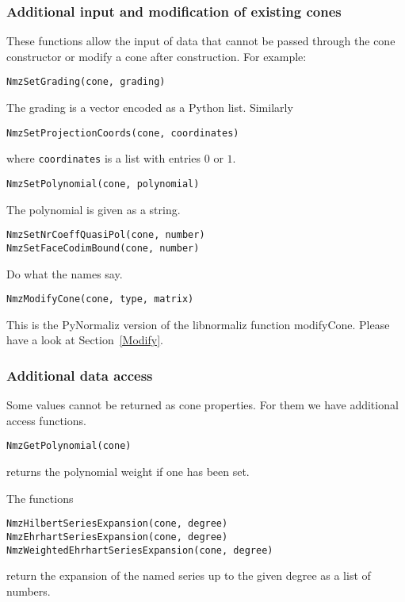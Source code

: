 \documentclass[12pt,a4paper]{scrartcl}
\theoremstyle{definition}
\begin{document}
\begin{small}
\subsubsection{Additional input and modification of existing cones}

These functions allow the input of data that cannot be passed through the cone constructor or modify a cone after construction. For example:
\begin{Verbatim}
NmzSetGrading(cone, grading)
\end{Verbatim}
The grading is a vector encoded as a Python list. Similarly
\begin{Verbatim}
NmzSetProjectionCoords(cone, coordinates)
\end{Verbatim}
where \verb|coordinates| is a list with entries $0$ or $1$.

\begin{Verbatim}
NmzSetPolynomial(cone, polynomial)
\end{Verbatim}
The polynomial is given as a string.

\begin{Verbatim}
NmzSetNrCoeffQuasiPol(cone, number)
NmzSetFaceCodimBound(cone, number)
\end{Verbatim}
Do what the names say.

\begin{Verbatim}
NmzModifyCone(cone, type, matrix)
\end{Verbatim}
This is the PyNormaliz version of the libnormaliz function modifyCone. Please have a look at Section~\ref{Modify}.

\subsubsection{Additional data access}

Some values cannot be returned as cone properties. For them we have additional access functions.

\begin{Verbatim}
NmzGetPolynomial(cone)
\end{Verbatim}
returns the polynomial weight if one has been set.

The functions
\begin{Verbatim}
NmzHilbertSeriesExpansion(cone, degree)
NmzEhrhartSeriesExpansion(cone, degree)
NmzWeightedEhrhartSeriesExpansion(cone, degree)
\end{Verbatim}
return the expansion of the named series up to the given degree as a list of numbers.


\end{small}
\end{document}
